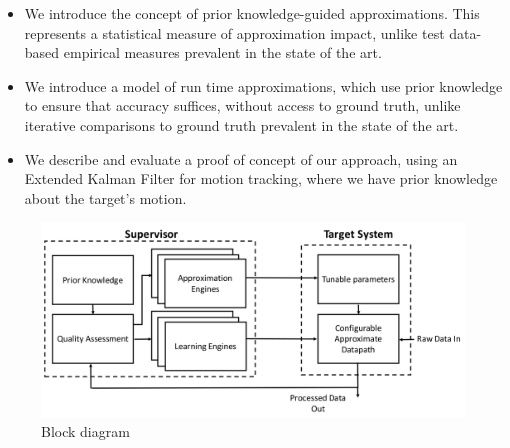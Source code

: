 \begin{itemize}
\item	We introduce the concept of prior knowledge-guided approximations. This represents a statistical measure of approximation impact, unlike test data-based empirical measures prevalent in the state of the art.
\item	We introduce a model of run time approximations, which use prior knowledge to ensure that accuracy suffices, without access to ground truth, unlike iterative comparisons to ground truth prevalent in the state of the art.
\item 	We describe and evaluate a proof of concept of our approach, using an Extended Kalman Filter for motion tracking, where we have prior knowledge about the target's motion. 
\end{itemize}


\begin{figure}[tb]
  \centering
  \includegraphics[width=\columnwidth]{img/block_diagram.png}
  \caption{Block diagram}
  \label{fig:block_diagram}
\end{figure}
